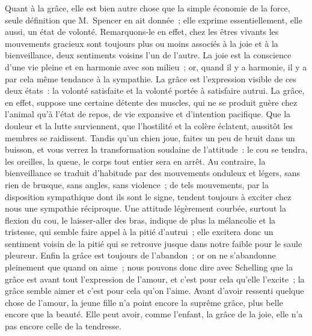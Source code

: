 \documentclass[french,twoside]{book} %
\begin{document}
Quant à la grâce, elle est bien autre chose que la simple économie de la force, seule définition que M. Spencer en ait donnée ; elle exprime essentiellement, elle aussi, un état de volonté. Remarquons-le en effet, chez les êtres vivants les mouvements gracieux sont toujours plus ou moins associés à la joie et à la bienveillance, deux sentiments voisins l’un de l’autre. La joie est la conscience  d’une vie pleine et en harmonie avec son milieu ; or, quand il y a harmonie, il y a par cela même tendance à la sympathie. La grâce est l’expression visible de ces deux états : la volonté satisfaite et la volonté portée à satisfaire autrui. La grâce, en effet, suppose une certaine détente des muscles, qui ne se produit guère chez l’animal qu’à l’état de repos, de vie expansive et d’intention pacifique. Que la douleur et la lutte surviennent, que l’hostilité et la colère éclatent, aussitôt les membres se raidissent. Tandis qu’un chien joue, faites un peu de bruit dans un buisson, et vous verrez la transformation soudaine de l’attitude : le cou se tendra, les oreilles, la queue, le corps tout entier sera en arrêt. Au contraire, la bienveillance se traduit d’habitude par des mouvements onduleux et légers, sans rien de brusque, sans angles, sans violence ; de tels mouvements, par la disposition sympathique dont ils sont le signe, tendent toujours à exciter chez nous une sympathie réciproque. Une attitude légèrement courbée, surtout la flexion du cou, le laisser-aller des bras, indique de plus la mélancolie et la tristesse, qui semble faire appel à la pitié d’autrui ; elle excitera donc un sentiment voisin de la pitié qui se retrouve jusque dans notre faible pour le saule pleureur. Enfin la grâce est toujours de l’abandon ; or on ne s’abandonne pleinement que quand on aime ; nous pouvons donc dire avec Schelling que la grâce est avant tout l’expression de l’amour, et c’est pour cela qu’elle l’excite ; la grâce semble aimer et c’est pour cela qu’on l’aime. Avant d’avoir ressenti quelque chose de l’amour, la jeune fille n’a point encore la suprême grâce, plus belle encore que la  beauté. Elle peut avoir, comme l’enfant, la grâce de la joie, elle n’a pas encore celle de la tendresse.\par
\end{document}
